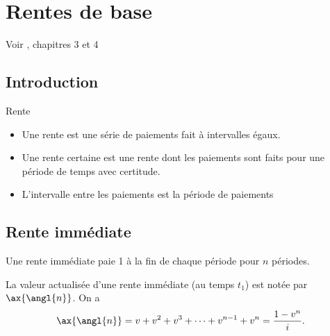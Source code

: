 \chapter{Rentes de base}
Voir \cite{kellison2006theory}, chapitres 3 et 4
\section{Introduction}

\begin{definition}{Rente}{}
	\begin{itemize}
		\item Une rente est une série de paiements fait à intervalles égaux. 
		\item Une rente certaine est une rente dont les paiements sont faits pour une période de temps avec certitude. 
		\item L'intervalle entre les paiements est la période de paiements
	\end{itemize}
\end{definition}

\section{Rente immédiate}

Une rente immédiate paie 1 à la fin de chaque période pour $n$ périodes. 

\begin{center}
\end{center}

La valeur actualisée d'une rente immédiate (au temps \textcolor{dlblue}{$t_1$}) est notée par $\ax{\angl{n}}$. On a 
$$\ax{\angl{n}} = v + v^2 + v^3 + \dots + v^{n-1} + v^n = \frac{1 - v^n}{i}.$$

